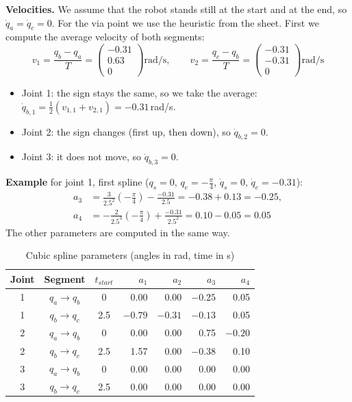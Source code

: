 \documentclass[11pt, a4paper]{article}
\begin{document}
\textbf{Velocities.} We assume that the robot stands still at the start and at the end, so
$\dot q_a = \dot q_c = 0$. For the via point we use the heuristic from the sheet. First we compute the
average velocity of both segments:
\[
  v_1 = \frac{q_b - q_a}{T} = \begin{pmatrix} -0.31 \\ 0.63 \\ 0 \end{pmatrix} \text{rad/s},
  \qquad
  v_2 = \frac{q_c - q_b}{T} = \begin{pmatrix} -0.31 \\ -0.31 \\ 0 \end{pmatrix} \text{rad/s}
\]
\begin{itemize}
  \item Joint 1: the sign stays the same, so we take the average:
        $\dot q_{b,1} = \frac{1}{2}(v_{1,1} + v_{2,1}) = -0.31$\,rad/s.
  \item Joint 2: the sign changes (first up, then down), so $\dot q_{b,2} = 0$.
  \item Joint 3: it does not move, so $\dot q_{b,3} = 0$.
\end{itemize}

\textbf{Example} for joint 1, first spline ($q_s = 0$, $q_e = -\frac{\pi}{4}$, $\dot q_s = 0$,
$\dot q_e = -0.31$):
\begin{align*}
  a_3 &= \frac{3}{2.5^2}\left(-\frac{\pi}{4}\right) - \frac{-0.31}{2.5} = -0.38 + 0.13 = -0.25, \\
  a_4 &= -\frac{2}{2.5^3}\left(-\frac{\pi}{4}\right) + \frac{-0.31}{2.5^2} = 0.10 - 0.05 = 0.05
\end{align*}
The other parameters are computed in the same way.

\begin{table}[H]
  \centering
  \caption{Cubic spline parameters (angles in rad, time in s)}
  \begin{tabular}{c c c r r r r}
    \toprule
    Joint & Segment & $t_{start}$ & $a_1$ & $a_2$ & $a_3$ & $a_4$ \\
    \midrule
    1 & $q_a \to q_b$ & 0   & 0.00    & 0.00    & $-0.25$ & 0.05 \\
    1 & $q_b \to q_c$ & 2.5 & $-0.79$ & $-0.31$ & $-0.13$ & 0.05 \\
    2 & $q_a \to q_b$ & 0   & 0.00    & 0.00    & 0.75    & $-0.20$ \\
    2 & $q_b \to q_c$ & 2.5 & 1.57    & 0.00    & $-0.38$ & 0.10 \\
    3 & $q_a \to q_b$ & 0   & 0.00    & 0.00    & 0.00    & 0.00 \\
    3 & $q_b \to q_c$ & 2.5 & 0.00    & 0.00    & 0.00    & 0.00 \\
    \bottomrule
  \end{tabular}
\end{table}
\end{document}
